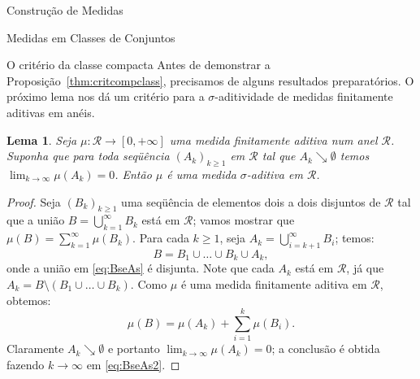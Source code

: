\documentclass[oneside,final,11pt]{amsbook}
\theoremstyle{remark}\newtheorem{exercise}{Exercício}[chapter]
\theoremstyle{remark}\newtheorem{*exercise}[exercise]{\hbox to 0pt{\hskip 0pt minus 1fil*}Exercício}
\theoremstyle{definition}\newtheorem{exdefin}{Definição}[chapter]
\theoremstyle{plain}\newtheorem{teo}{Teorema}[section]
\theoremstyle{plain}\newtheorem{lem}[teo]{Lema}
\theoremstyle{plain}\newtheorem{prop}[teo]{Proposição}
\theoremstyle{plain}\newtheorem{cor}[teo]{Corolário}
\theoremstyle{definition}\newtheorem{defin}[teo]{Definição}
\theoremstyle{remark}\newtheorem{rem}[teo]{Observação}
\theoremstyle{definition}\newtheorem{notation}[teo]{Notação}
\theoremstyle{definition}\newtheorem{convention}[teo]{Convenção}
\theoremstyle{definition}\newtheorem{example}[teo]{Exemplo}
\numberwithin{section}{chapter}
\numberwithin{equation}{section}
\begin{document}
\begin{chapter}{Construção de Medidas}
\begin{section}{Medidas em Classes de Conjuntos}
\begin{subsection}{O critério da classe compacta}
Antes de demonstrar a Proposição~\ref{thm:critcompclass}, precisamos de alguns resultados
preparatórios. O próximo lema nos dá um critério para a $\sigma$-aditividade de medidas
finitamente aditivas em anéis.
\begin{lem}\label{thm:critcontsupvazio}
Seja $\mu:\mathcal R\to[0,+\infty]$ uma medida finitamente aditiva num anel $\mathcal R$.
Suponha que para toda seqüência $(A_k)_{k\ge1}$ em $\mathcal R$ tal que $A_k\searrow\emptyset$
temos $\lim_{k\to\infty}\mu(A_k)=0$. Então $\mu$ é uma medida $\sigma$-aditiva em $\mathcal R$.
\end{lem}
\begin{proof}
Seja $(B_k)_{k\ge1}$ uma seqüência de elementos dois a dois disjuntos de $\mathcal R$
tal que a união $B=\bigcup_{k=1}^\infty B_k$ está em $\mathcal R$; vamos mostrar
que $\mu(B)=\sum_{k=1}^\infty\mu(B_k)$. Para cada $k\ge1$, seja
$A_k=\bigcup_{i=k+1}^\infty B_i$; temos:
\begin{equation}\label{eq:BseAs}
B=B_1\cup\ldots\cup B_k\cup A_k,
\end{equation}
onde a união em \eqref{eq:BseAs} é disjunta. Note que cada $A_k$ está em $\mathcal R$, já que
$A_k=B\setminus(B_1\cup\ldots\cup B_k)$. Como $\mu$ é uma medida finitamente aditiva
em $\mathcal R$, obtemos:
\begin{equation}\label{eq:BseAs2}
\mu(B)=\mu(A_k)+\sum_{i=1}^k\mu(B_i).
\end{equation}
Claramente $A_k\searrow\emptyset$ e portanto $\lim_{k\to\infty}\mu(A_k)=0$; a conclusão
é obtida fazendo $k\to\infty$ em \eqref{eq:BseAs2}.
\end{proof}


\end{subsection}
\end{section}
\end{chapter}
\end{document}
